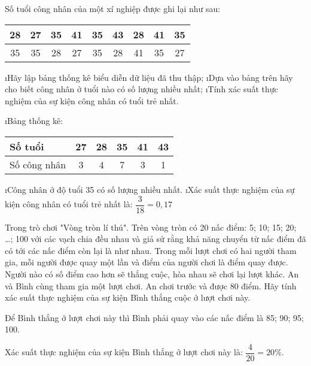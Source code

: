 \begin{bt}
	Số tuổi công nhân của một xí nghiệp được ghi lại như sau:
	\begin{center}
		\begin{tabular}{|c|c|c|c|c|c|c|c|c|}
			\hline
			28&	27&	35&	41&	35&	43&	28&	41&	35\\
			\hline
			35	&35	&28	&27	&35	&28	&41	&35&	27\\
			\hline
		\end{tabular}
	\end{center}
	\begin{enumerate}[a),leftmargin=*]
		\i Hãy lập bảng thống kê biểu diễn dữ liệu đã thu thập;
		\i Dựa vào bảng trên hãy cho biết công nhân ở tuổi nào có số lượng nhiều nhất;
		\i Tính xác suất thực nghiệm của sự kiện công nhân có tuổi trẻ nhất.
	\end{enumerate}
	\begin{loigiaichuong41}
		\begin{enumerate}[a),leftmargin=*]
			\i Bảng thống kê:
			\begin{center}
				\begin{tabular}{|l|c|c|c|c|c|}
					\hline
					Số tuổi & 27&28&35&41&43\\
					\hline	 
					Số công nhân & 3&4&7&3&1\\
					\hline	
				\end{tabular}
			\end{center} 
			\i	Công nhân ở độ tuổi  35 có số lượng nhiều nhất.
			\i	Xác suất thực nghiệm của sự kiện công nhân có tuổi trẻ nhất là: $\dfrac{3}{18} = 0,17$ 
		\end{enumerate}
	\end{loigiaichuong41}
\end{bt}
\begin{bt}
	Trong trò chơi "Vòng tròn lí thú". Trên vòng tròn có 20  nấc điểm:  5;  10;  15;  20; \ldots; 100  với các vạch chia đều nhau và giả sử rằng khả năng chuyển từ nấc điểm đã có tới các nấc điểm còn lại là như nhau. Trong mỗi lượt chơi có hai người tham gia, mỗi người được quay một lần và điểm của người chơi là điểm quay được. Người nào có số điểm cao hơn sẽ thắng cuộc, hòa nhau sẽ chơi lại lượt khác. An và Bình cùng tham gia một lượt chơi. An chơi trước và được 80 điểm. Hãy tính xác suất thực nghiệm của sự kiện Bình thắng cuộc ở lượt chơi này.
	\begin{loigiaichuong41}
		Để Bình thắng ở lượt chơi này thì Bình phải quay vào các nấc điểm là  85;  90; 95; 100.
		  
		Xác suất thực nghiệm của sự kiện Bình thắng ở lượt chơi này là:  $\dfrac{4}{{20}} = 20\% $.
	\end{loigiaichuong41}
\end{bt}
